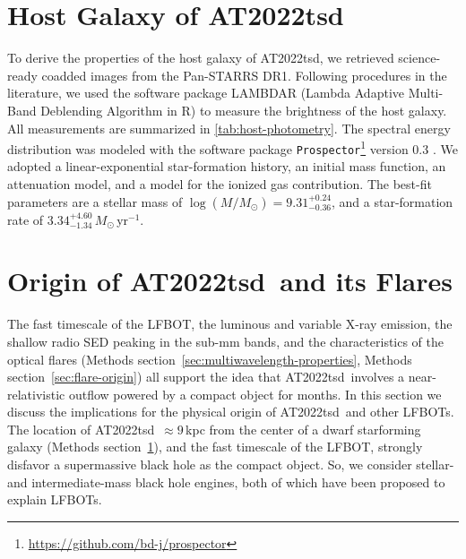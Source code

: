 \documentclass{nature_plusfigure}
\newcommand{\at}{AT2022tsd}
\begin{document}
\begin{methods}
\section{Host Galaxy of \at}
\label{sec:hostgalaxy}

To derive the properties of the host galaxy of \at, we retrieved science-ready coadded images from the Pan-STARRS DR1\cite{Chambers2016}. Following procedures in the literature\cite{Schulze2021}, we used the software package LAMBDAR\cite{Wright2016}  (Lambda Adaptive Multi-Band Deblending Algorithm in R) to measure the brightness of the host galaxy. All measurements are summarized in \ref{tab:host-photometry}. The spectral energy distribution was modeled with the software package \texttt{Prospector}\footnote{\href{https://github.com/bd-j/prospector}{https://github.com/bd-j/prospector}} version 0.3 \cite{Johnson2021}. We adopted a linear-exponential star-formation history, an initial mass function\cite{Chabrier2003}, an attenuation model\cite{Calzetti2000}, and a model\cite{Byler2017} for the ionized gas contribution. 
The best-fit parameters are a stellar mass of $\log(M/M_\odot)=9.31^{+0.24}_{-0.36}$, and a star-formation rate of $3.34^{+4.60}_{-1.34}\,M_\odot\,$yr$^{-1}$.

\section{Origin of \at\ and its Flares}
\label{sec:at2022tsd-origin}

The fast timescale of the LFBOT, the luminous and variable X-ray emission, the shallow radio SED peaking in the sub-mm bands, and the characteristics of the optical flares (Methods section~\ref{sec:multiwavelength-properties}, Methods section~\ref{sec:flare-origin}) all support the idea that \at\ involves a near-relativistic outflow powered by a compact object for months. In this section we discuss the implications for the physical origin of \at\ and other LFBOTs. The location of \at\ $\approx9\,$kpc from the center of a dwarf starforming galaxy (Methods section~\ref{sec:hostgalaxy}), and the fast timescale of the LFBOT, strongly disfavor a supermassive black hole as the compact object. So, we consider stellar- and intermediate-mass black hole engines, both of which have been proposed to explain LFBOTs\cite{Perley2019,Margutti2019,Metzger2022,Chen2023}. 


\end{methods}
\end{document}
